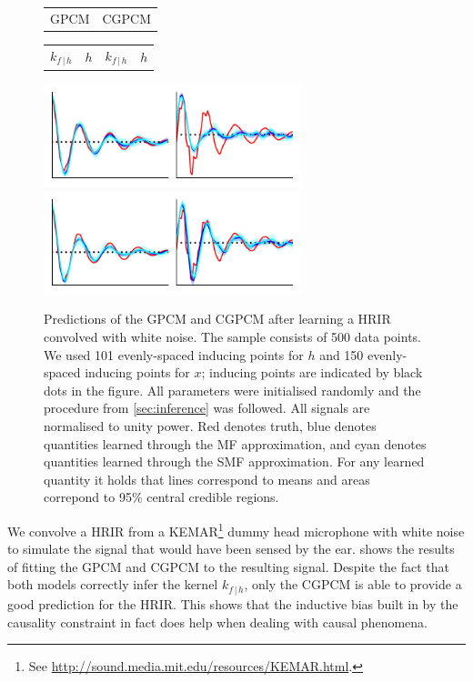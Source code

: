 \documentclass{article}
\newcommand{\cond}{\, | \,}               %
\begin{document}
\begin{figure}[t]
    \centering
    \begin{tabularx}{\linewidth}{>{\centering}X>{\centering}X}
        GPCM & CGPCM
    \end{tabularx}
    \begin{tabularx}{\linewidth}{>{\centering}X>{\centering}X>{\centering}X>{\centering}X}
        $k_{f\cond h}$ & $h$ & $k_{f\cond h}$ & $h$
    \end{tabularx}
    \includegraphics[width=.49\linewidth, height=3cm]{resources/hrtf_gpcm.pdf}
    \includegraphics[width=.49\linewidth, height=3cm]{resources/hrtf_cgpcm.pdf}
    \caption{Predictions of the GPCM and CGPCM after learning a HRIR convolved with white noise. The sample consists of 500 data points. We used 101 evenly-spaced inducing points for $h$ and 150 evenly-spaced inducing points for $x$; inducing points are indicated by black dots in the figure. All parameters were initialised randomly and the procedure from \cref{sec:inference} was followed. All signals are normalised to unity power. {\color{red}Red} denotes truth, {\color{blue}blue} denotes quantities learned through the MF approximation, and {\color{mycyan}cyan} denotes quantities learned through the SMF approximation. For any learned quantity it holds that lines correspond to means and areas correpond to 95\% central credible regions.}
    \label{fig:hrir}
\end{figure}

We convolve a HRIR from a KEMAR\footnote{See \url{http://sound.media.mit.edu/resources/KEMAR.html}.} dummy head microphone with white noise to simulate the signal that would have been sensed by the ear.  shows the results of fitting the GPCM and CGPCM to the resulting signal. Despite the fact that both models correctly infer the kernel $k_{f \cond h}$, only the CGPCM is able to provide a good prediction for the HRIR. This shows that the inductive bias built in by the causality constraint in fact does help when dealing with causal phenomena.
\end{document}
